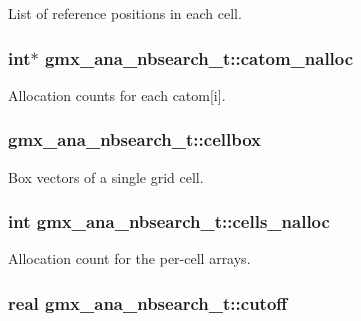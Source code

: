 \-List of reference positions in each cell. \hypertarget{structgmx__ana__nbsearch__t_a8ec071eaef3ccceb7f4307a940af2536}{
\subsubsection[{catom\-\_\-nalloc}]{\setlength{\rightskip}{0pt plus 5cm}int$\ast$ {\bf gmx\-\_\-ana\-\_\-nbsearch\-\_\-t\-::catom\-\_\-nalloc}}}\label{structgmx__ana__nbsearch__t_a8ec071eaef3ccceb7f4307a940af2536}
\-Allocation counts for each {\ttfamily catom}\mbox{[}i\mbox{]}. \hypertarget{structgmx__ana__nbsearch__t_ab045c8aec28268d8b9a75ab5d645f95a}{
\subsubsection[{cellbox}]{ {\bf gmx\-\_\-ana\-\_\-nbsearch\-\_\-t\-::cellbox}}}\label{structgmx__ana__nbsearch__t_ab045c8aec28268d8b9a75ab5d645f95a}
\-Box vectors of a single grid cell. \hypertarget{structgmx__ana__nbsearch__t_a6de98ecd6bf4b5841eba26122d27ba20}{
\subsubsection[{cells\-\_\-nalloc}]{\setlength{\rightskip}{0pt plus 5cm}int {\bf gmx\-\_\-ana\-\_\-nbsearch\-\_\-t\-::cells\-\_\-nalloc}}}\label{structgmx__ana__nbsearch__t_a6de98ecd6bf4b5841eba26122d27ba20}
\-Allocation count for the per-\/cell arrays. \hypertarget{structgmx__ana__nbsearch__t_a80a81fa98d378f0e3c274a0031ffdc95}{
\subsubsection[{cutoff}]{\setlength{\rightskip}{0pt plus 5cm}real {\bf gmx\-\_\-ana\-\_\-nbsearch\-\_\-t\-::cutoff}}}\label{structgmx__ana__nbsearch__t_a80a81fa98d378f0e3c274a0031ffdc95}
